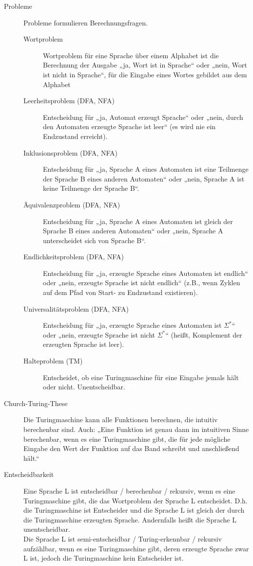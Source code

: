 \documentclass[a4paper,10pt]{article}
\newcommand{\vl}[1]{\colorbox{light-gray}{\textcolor{white}{\textbf{#1}}}}
\begin{document}
\begin{description}
        \item[Probleme] Probleme formulieren Berechnungsfragen.
            \begin{description}
                \item[Wortproblem] Wortproblem für eine Sprache über einem Alphabet ist die Berechnung der Ausgabe „ja, Wort ist in Sprache“ oder „nein, Wort ist nicht in Sprache“, für die Eingabe eines Wortes gebildet aus dem Alphabet \vl{FS 3}
                \item[Leerheitsproblem (DFA, NFA)] Entscheidung für „ja, Automat erzeugt Sprache“ oder „nein, durch den Automaten erzeugte Sprache ist leer“ (es wird nie ein Endzustand erreicht). \vl{FS 10}
                \item[Inklusionsproblem (DFA, NFA)] Entscheidung für „ja, Sprache A eines Automaten ist eine Teilmenge der Sprache B eines anderen Automaten“ oder „nein, Sprache A ist keine Teilmenge der Sprache B“. \vl{FS 10}
                \item[Äquivalenzproblem (DFA, NFA)] Entscheidung für „ja, Sprache A eines Automaten ist gleich der Sprache B eines anderen Automaten“ oder „nein, Sprache A unterscheidet sich von Sprache B“. \vl{FS 10}
                \item[Endlichkeitsproblem (DFA, NFA)] Entscheidung für „ja, erzeugte Sprache eines Automaten ist endlich“ oder „nein, erzeugte Sprache ist nicht endlich“ (z.B., wenn Zyklen auf dem Pfad von Start- zu Endzustand existieren). \vl{FS 10}
                \item[Universalitätsproblem (DFA, NFA)] Entscheidung für „ja, erzeugte Sprache eines Automaten ist $\Sigma^*$“ oder „nein, erzeugte Sprache ist nicht $\Sigma^*$“ (heißt, Komplement der erzeugten Sprache ist leer). \vl{FS 10}
                \item[Halteproblem (TM)] Entscheidet, ob eine Turingmaschine für eine Eingabe jemals hält oder nicht. Unentscheidbar. \vl{FS 19}
            \end{description}

        \item[Church-Turing-These]
            Die Turingmaschine kann alle Funktionen berechnen, die intuitiv berechenbar sind. Auch: „Eine Funktion ist genau dann
            im intuitiven Sinne berechenbar, wenn es eine Turingmaschine gibt, die für jede mögliche Eingabe den Wert der Funktion auf
            das Band schreibt und anschließend hält.“ \vl{FS 18}

        \item[Entscheidbarkeit]
            Eine Sprache L ist entscheidbar / berechenbar / rekursiv, wenn es eine Turingmaschine gibt, die das Wortproblem der Sprache L entscheidet.
            D.h. die Turingmaschine ist Entscheider und die Sprache L ist gleich der durch die Turingmaschine erzeugten Sprache.
            Andernfalls heißt die Sprache L unentscheidbar. \\
            Die Sprache L ist semi-entscheidbar / Turing-erkennbar / rekursiv aufzählbar, wenn es eine Turingmaschine gibt, deren erzeugte Sprache zwar L ist, jedoch die Turingmaschine kein Entscheider ist. \vl{FS 19}


\end{description}
\end{document}
